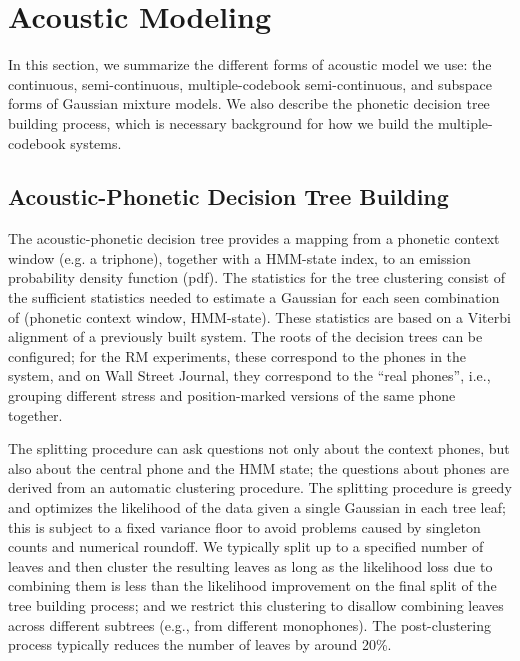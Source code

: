 \documentclass{article}
\begin{document}


\section{Acoustic Modeling}
\label{sec:am}
In this section, we summarize the different forms of acoustic model we use: 
the continuous, semi-continuous, multiple-codebook semi-continuous, and 
subspace forms of Gaussian mixture models. 
We also describe the phonetic decision tree building process, which is 
necessary background for how we build the multiple-codebook systems.

\subsection{Acoustic-Phonetic Decision Tree Building}
The acoustic-phonetic decision tree provides a mapping from
a phonetic context window (e.g. a triphone), together with a HMM-state index, 
to an emission probability density function (pdf). 
%
The statistics for the tree clustering consist of the 
sufficient statistics needed to estimate a Gaussian for each seen combination 
of (phonetic context window, HMM-state).  These statistics are based on a Viterbi 
alignment of a previously built system.  The roots
of the decision trees can be configured; for the RM experiments, these correspond to
the phones in the system, and on Wall Street Journal, they
correspond to the ``real phones'', i.e., grouping different stress and
position-marked versions of the same phone together.  

The splitting procedure can ask questions not only about the context phones,
but also about the central phone and the HMM state; the questions about phones are 
derived from an automatic clustering procedure.  The splitting procedure is
greedy and optimizes the likelihood of the data given a single Gaussian in each
tree leaf; this is subject to a fixed variance floor to avoid problems caused
by singleton counts and numerical roundoff.  We typically split up to a 
specified number of leaves and then cluster the resulting leaves as long as the
likelihood loss due to combining them is less than the likelihood improvement
on the final split of the tree building process; and we restrict this 
clustering to disallow combining leaves across different subtrees (e.g., from 
different monophones).  The post-clustering process typically reduces the number 
of leaves by around 20\%.
\end{document}
